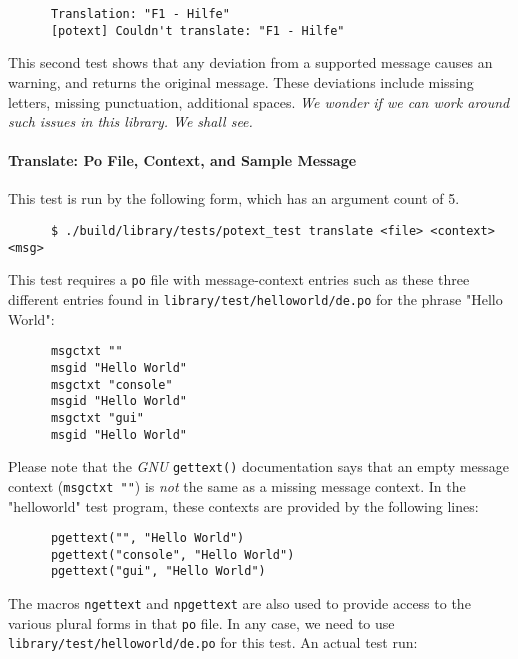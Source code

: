    \begin{verbatim}
      Translation: "F1 - Hilfe"
      [potext] Couldn't translate: "F1 - Hilfe"
   \end{verbatim}

   This second test shows that any deviation from a supported message causes an
   warning, and returns the original message.
   These deviations include missing letters, missing punctuation,
   additional spaces.
   \textsl{We wonder if we can work around such issues in this library.
   We shall see.}

\paragraph{Translate: Po File, Context, and Sample Message}
\label{paragraph:potext_test_translate_po_context_message}

   This test is run by the following form, which has an argument count
   of 5.

   \begin{verbatim}
      $ ./build/library/tests/potext_test translate <file> <context> <msg>
   \end{verbatim}

   This test requires a \texttt{po} file with message-context
   entries such as these three different entries found in
   \texttt{library/test/helloworld/de.po} for the phrase
   "Hello World":

   \begin{verbatim}
      msgctxt ""
      msgid "Hello World"
      msgctxt "console"
      msgid "Hello World"
      msgctxt "gui"
      msgid "Hello World"
   \end{verbatim}

   Please note that the \textsl{GNU} \texttt{gettext()} documentation says
   that an empty message context (\texttt{msgctxt ""}) is \textsl{not}
   the same as a missing message context.
   In the "helloworld" test program, these contexts are provided by the
   following lines:

   \begin{verbatim}
      pgettext("", "Hello World")
      pgettext("console", "Hello World")
      pgettext("gui", "Hello World")
   \end{verbatim}

   The macros \texttt{ngettext} and \texttt{npgettext} are also used to provide
   access to the various plural forms in that \texttt{po} file.
   In any case, we need to use 
   \texttt{library/test/helloworld/de.po} for this test.
   An actual test run:

